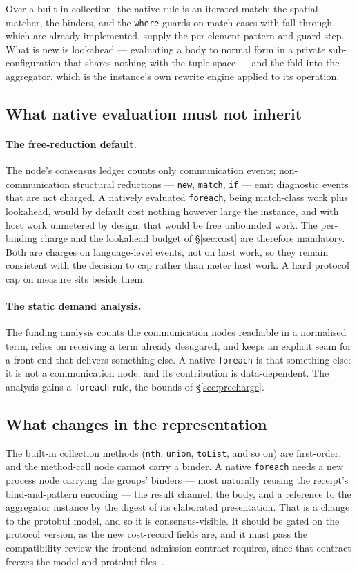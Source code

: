 \documentclass[11pt]{article}
\theoremstyle{definition}
\theoremstyle{plain}
\theoremstyle{remark}
\newcommand{\fe}{\texttt{foreach}}
\begin{document}
Over a built-in collection, the native rule is an iterated match: the spatial
matcher, the binders, and the \texttt{where} guards on match cases with
fall-through, which are already implemented, supply the per-element
pattern-and-guard step. What is new is lookahead --- evaluating a body to normal
form in a private sub-configuration that shares nothing with the tuple space ---
and the fold into the aggregator, which is the instance's own rewrite engine
applied to its operation.

\subsection{What native evaluation must not inherit}

\paragraph{The free-reduction default.} The node's consensus ledger counts
only communication events; non-communication structural reductions ---
\texttt{new}, \texttt{match}, \texttt{if} --- emit diagnostic events that are
not charged. A natively evaluated \fe{}, being match-class work plus lookahead,
would by default cost nothing however large the instance, and with host work
unmetered by design, that would be free unbounded work. The per-binding charge
and the lookahead budget of \S\ref{sec:cost} are therefore mandatory. Both are
charges on language-level events, not on host work, so they remain consistent
with the decision to cap rather than meter host work. A hard protocol cap on
measure sits beside them.

\paragraph{The static demand analysis.} The funding analysis counts the
communication nodes reachable in a normalised term, relies on receiving a term
already desugared, and keeps an explicit seam for a front-end that delivers
something else. A native \fe{} is that something else: it is not a
communication node, and its contribution is data-dependent. The analysis gains
a \fe{} rule, the bounds of \S\ref{sec:precharge}.

\subsection{What changes in the representation}

The built-in collection methods (\texttt{nth}, \texttt{union},
\texttt{toList}, and so on) are first-order, and the method-call node cannot
carry a binder. A native \fe{} needs a new process node carrying the groups'
binders --- most naturally reusing the receipt's bind-and-pattern encoding ---
the result channel, the body, and a reference to the aggregator instance by the
digest of its elaborated presentation. That is a change to the protobuf model,
and so it is consensus-visible. It should be gated on the protocol version, as
the new cost-record fields are, and it must pass the compatibility review the
frontend admission contract requires, since that contract freezes the model and
protobuf files~\cite{f1r3nodeOTE}.
\end{document}
